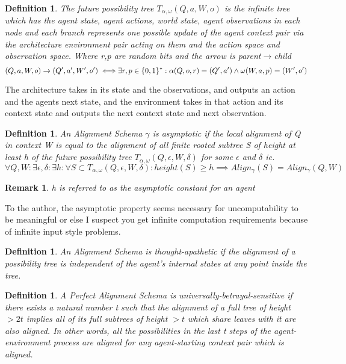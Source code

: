 \documentclass[12pt]{article}
\newtheorem{mydef}[thm]{Definition}
\newtheorem{rem}[thm]{Remark}
\begin{document}
\begin{mydef} The future possibility tree $T_{\alpha,\omega}(Q,a,W,o)$ is the infinite tree which has the agent state, agent actions, world state, agent observations in each node and each branch represents one possible update of the agent context pair via the architecture environment pair acting on them and the action space and observation space. Where r,p are random bits and the arrow is parent$\rightarrow$child
$$(Q,a,W,o) \rightarrow (Q',a',W',o')  \\ \iff \\ \exists r,p \in \{0,1\}^* :
\alpha(Q,o, r) = (Q', a') \land \omega(W,a,p) = (W', o')$$
\end{mydef}
The architecture takes in its state and the observations, and outputs an action and the agents next state, and the environment takes in that action and its context state and outputs the next context state and next observation.
\begin{mydef} An Alignment Schema $\gamma$ is asymptotic if the local alignment of Q in context W is equal to the alignment of all finite rooted subtree S of height at least h of the future possibility tree $T_{\alpha,\omega}(Q,\epsilon,W,\delta)$ for some $\epsilon$ and $\delta$ ie. $ \forall Q, W : \exists \epsilon, \delta : \exists h : \forall S \subset T_{\alpha,\omega}(Q,\epsilon,W,\delta) : height(S) \geq h \implies Align_\gamma (S) = Align_\gamma (Q,W) $\end{mydef}
\begin{rem}h is referred to as the asymptotic constant for an agent\end{rem}

To the author, the asymptotic property seems necessary for uncomputability to be meaningful or else I suspect you get infinite computation requirements because of infinite input style problems.
\begin{mydef} An Alignment Schema is thought-apathetic if the alignment of a possibility tree is independent of the agent's internal states at any point inside the tree. \end{mydef}
\begin{mydef} A Perfect Alignment Schema is universally-betrayal-sensitive if there exists a natural number t such that the alignment of a full tree of height  $>2t$ implies all of its full subtrees of height $>t$ which share leaves with it are also aligned. In other words, all the possibilities in the last t steps of the agent-environment process are aligned for any agent-starting context pair which is aligned.\end{mydef}
\end{document}
